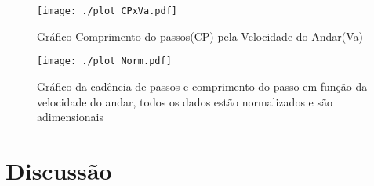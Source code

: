 \documentclass[a4paper,10pt]{article}
\begin{document}
\begin{figure}[h]

 \centering
 \texttt{[image: ./plot\_CPxVa.pdf]}
 \caption{Gráfico Comprimento do passos(CP) pela Velocidade do Andar(Va)}
 \label{plotCPxVa}
\end{figure}

\begin{figure}[h]
 \centering
 \texttt{[image: ./plot\_Norm.pdf]}
 \caption{Gráfico da cadência de passos e comprimento do passo em função da velocidade do andar, todos os dados estão normalizados e são adimensionais}
 \label{plotNorm}
\end{figure}


\FloatBarrier
\section{Discussão}
\end{document}
